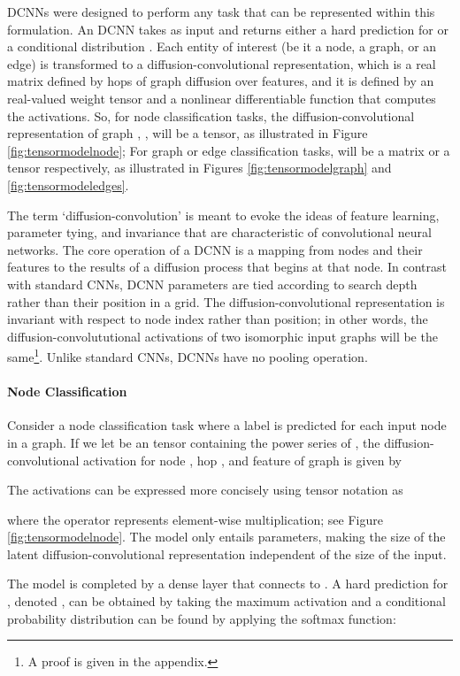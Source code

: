 \documentclass{article}
\begin{document}
DCNNs were designed to perform any task that can be represented within this formulation.  An DCNN takes  as input and returns either a hard prediction for  or a conditional distribution .  Each entity of interest (be it a node, a graph, or an edge) is transformed to a diffusion-convolutional representation, which is a  real matrix defined by  hops of graph diffusion over  features, and it is defined by an  real-valued weight tensor  and a nonlinear differentiable function  that computes the activations.  So, for node classification tasks, the diffusion-convolutional representation of graph , , will be a  tensor, as illustrated in Figure \ref{fig:tensormodelnode};  For graph or edge classification tasks,  will be a  matrix or a  tensor respectively, as illustrated in Figures \ref{fig:tensormodelgraph} and \ref{fig:tensormodeledges}.

The term `diffusion-convolution' is meant to evoke the ideas of feature learning, parameter tying, and invariance that are characteristic of convolutional neural networks.  The core operation of a DCNN is a mapping from nodes and their features to the results of a diffusion process that begins at that node.  In contrast with standard CNNs, DCNN parameters are tied according to search depth rather than their position in a grid.  The diffusion-convolutional representation is invariant with respect to node index rather than position; in other words, the diffusion-convolututional activations of two isomorphic input graphs will be the same\footnote{A proof is given in the appendix.}.  Unlike standard CNNs, DCNNs have no pooling operation.

\paragraph{Node Classification}
Consider a node classification task where a label  is predicted for each input node in a graph.  If we let  be an  tensor containing the power series of , the diffusion-convolutional activation  for node , hop , and feature  of graph  is given by

The activations can be expressed more concisely using tensor notation as

where the  operator represents element-wise multiplication; see Figure \ref{fig:tensormodelnode}.  The model only entails  parameters, making the size of the latent diffusion-convolutional representation independent of the size of the input.

The model is completed by a dense layer that connects  to .  A hard prediction for , denoted , can be obtained by taking the maximum activation and a conditional probability distribution  can be found by applying the softmax function:
\end{document}
